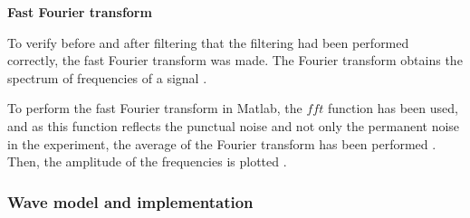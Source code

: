 \documentclass[12pt, a4paper]{article} %
\begin{document}
\setlength{\parindent}{0pt}
\setlength{\parskip}{8mm}
\textbf{Fast Fourier transform}
\setlength{\parskip}{0mm}

To verify before and after filtering that the filtering had been performed correctly, the fast Fourier transform was made. The Fourier transform obtains the spectrum of frequencies of a signal \cite{de2001transformada}.

\setlength{\parskip}{4mm}
\setlength{\parindent}{8pt}

To perform the fast Fourier transform in Matlab, the $fft$ function has been used, and as this function reflects the punctual noise and not only the permanent noise in the experiment, the average of the Fourier transform has been performed \cite{shabaninezhad2021matlab}. Then, the amplitude of the frequencies is plotted \cite{FourierTransform, frigo1998fftw}.

\setlength{\parskip}{0mm}
\subsubsection{Wave model and implementation}
\end{document}
